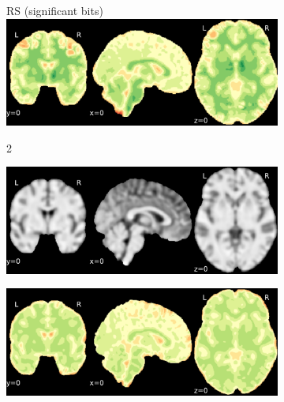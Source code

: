 \documentclass{article}
\begin{document}
\begin{landscape}
\begin{figure}
\begin{subfigure}[t]{0.2\paperheight}
        \end{subfigure}
        \begin{subfigure}[t]{0.2\paperheight}
            \centering
            RS (significant bits)
            \includegraphics[width=\textwidth]{figures/sig/fwhm_5/rs_ds001600_sub-1_sig.pdf}
        \end{subfigure}
        \begin{subfigure}[b][][c]{0.01\paperwidth} 2 \vspace*{15pt} \end{subfigure}
        \begin{subfigure}[t]{0.2\paperheight}
            \centering
            \includegraphics[width=\textwidth]{figures/ieee_T1/fwhm_5/ieee_ds001771_sub-36.pdf}
        \end{subfigure}
        \begin{subfigure}[t]{0.2\paperheight}
            \centering
            \includegraphics[width=\textwidth]{figures/sig/fwhm_5/rr_ds001771_sub-36_sig.pdf}

\end{subfigure}
\end{figure}
\end{landscape}
\end{document}
